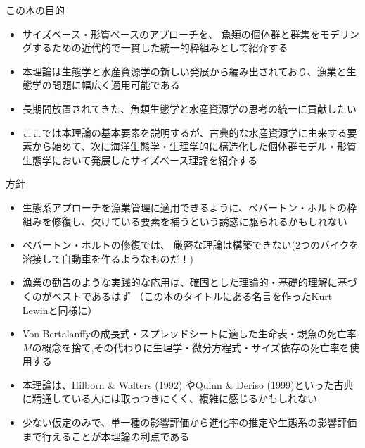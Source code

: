 \documentclass[
  ignorenonframetext,
]{beamer}
\providecommand{\tightlist}{%
  \setlength{\itemsep}{0pt}\setlength{\parskip}{0pt}}
\newcommand{\vspacesmall}{\vspace{3mm}}
\begin{document}
\begin{frame}{この本の目的}
\protect\hypertarget{ux3053ux306eux672cux306eux76eeux7684}{}

\begin{itemize}
\tightlist
\item
  サイズベース・形質ベースのアプローチを、
  魚類の個体群と群集をモデリングするための近代的で一貫した統一的枠組みとして紹介する\\
  \vspacesmall
\item
  本理論は生態学と水産資源学の新しい発展から編み出されており、漁業と生態学の問題に幅広く適用可能である\\
  \vspacesmall
\item
  長期間放置されてきた、魚類生態学と水産資源学の思考の統一に貢献したい\\
  \vspacesmall
\item
  ここでは本理論の基本要素を説明するが、古典的な水産資源学に由来する要素から始めて、次に海洋生態学・生理学的に構造化した個体群モデル・形質生態学において発展したサイズベース理論を紹介する
\end{itemize}

\end{frame}

\begin{frame}{方針}
\protect\hypertarget{ux65b9ux91dd}{}

\begin{itemize}[<+->]
\tightlist
\item
  生態系アプローチを漁業管理に適用できるように、べバートン・ホルトの枠組みを修復し、欠けている要素を補うという誘惑に駆られるかもしれない\\
\item
  べバートン・ホルトの修復では、
  厳密な理論は構築できない(2つのバイクを溶接して自動車を作るようなものだ！)\\
\item
  漁業の勧告のような実践的な応用は、確固とした理論的・基礎的理解に基づくのがベストであるはず
  （この本のタイトルにある名言を作ったKurt Lewinと同様に）\\
\item
  Von
  Bertalanffyの成長式・スプレッドシートに適した生命表・親魚の死亡率\(M\)の概念を捨て,その代わりに生理学・微分方程式・サイズ依存の死亡率を使用する\\
\item
  本理論は、Hilborn \& Walters (1992) やQuinn \& Deriso
  (1999)といった古典に精通している人には取っつきにくく、複雑に感じるかもしれない\\
\item
  少ない仮定のみで、単一種の影響評価から進化率の推定や生態系の影響評価まで行えることが本理論の利点である
\end{itemize}

\end{frame}
\end{document}
